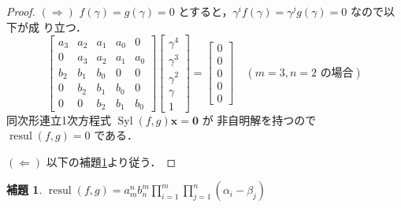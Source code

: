 \documentclass[12pt, uplatex, dvipdfmx]{jsarticle}
\newcommand{\ds}{\displaystyle}
\theoremstyle{definition}
\newtheorem{lemma}{補題}
\DeclareMathOperator{\Syl}{Syl}
\DeclareMathOperator{\resul}{resul}
\begin{document}
\begin{proof}
  $(\Rightarrow)$ $f(\gamma)=g(\gamma)=0$
  とすると，$\gamma^i f(\gamma) = \gamma^j g(\gamma)=0$ なので以下が成
  り立つ．
  \[
    \left[
      \begin{array}{ccccc}
        a_3 & a_{2} & a_1 & a_0 & 0\\
        0 & a_3 & a_2 & a_1 & a_0\\
        b_2 & b_1 & b_0 & 0 & 0\\
        0 & b_2 & b_1 & b_0 & 0\\
        0 & 0 & b_2 & b_1 & b_0
      \end{array}
    \right]\left[
      \begin{array}{c}
        \gamma^4\\
        \gamma^3\\
        \gamma^2\\
        \gamma\\
        1
      \end{array}
    \right] = \left[
      \begin{array}{c}
        0\\
        0\\
        0\\
        0\\
        0
      \end{array}
    \right] \quad (m=3, n=2 \text{ の場合})
  \]
  同次形連立1次方程式 $\Syl(f,g) \bm{x} = \bm{0}$ が
  非自明解を持つので $\resul(f,g)=0$ である．

  $(\Leftarrow)$ 以下の補題\ref{lem:explicit-resul}より従う．
\end{proof}

\begin{lemma}\label{lem:explicit-resul}
  $\ds \resul(f,g) =  a_m^n b_n^m \prod_{i=1}^{m} \prod_{j=1}^{n} (\alpha_i-\beta_j)$
\end{lemma}
\end{document}
